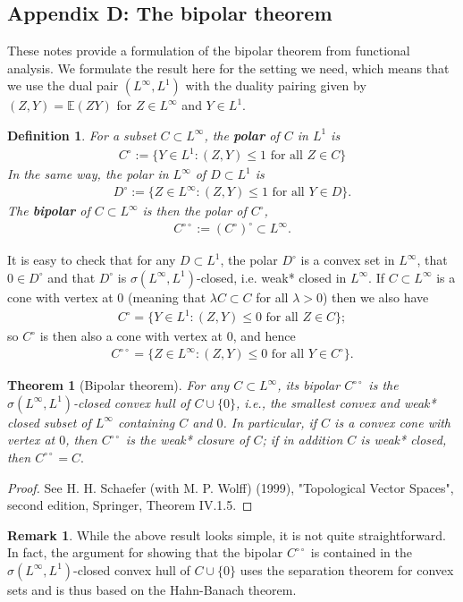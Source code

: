 \documentclass[12pt,a4paper, twoside]{article}
\newtheorem{thm}{Theorem}[section]
\newtheorem{defn}{Definition}[section]
\theoremstyle{definition}
\newtheorem{rem}{Remark}[section]
\newcommand{\EE}{\mathbb{E}} %
\begin{document}
\subsection{Appendix D: The bipolar theorem}
These notes provide a formulation of the bipolar theorem from functional analysis. We formulate the result here for the setting we need, which means that we use the dual pair $(L^\infty, L^1)$ with the duality pairing given by $(Z,Y)= \EE(ZY)$ for $Z \in L^\infty$ and $Y \in L^1$.
\begin{defn} For a subset $C \subset L^\infty$, the \textbf{polar} of $C$ in $L^1$ is 
\begin{align*}
C^\circ:= \{ Y \in L^1: (Z,Y) \leq 1 \text{ for all } Z \in C \}
\end{align*}
In the same way, the polar in $L^\infty$ of $D \subset L^1$ is 
\begin{align*}
D^\circ := \{ Z \in L^\infty : (Z,Y) \leq 1 \text{ for all } Y \in D \}.
\end{align*}
The \textbf{bipolar} of $C \subset L^\infty$ is then the polar of $C^\circ$, 
\begin{align*}
C^{\circ \circ} := (C^\circ)^\circ \subset L^\infty.
\end{align*}
\end{defn}
It is easy to check that for any $D \subset L^1$, the polar $D^\circ$ is a convex set in $L^\infty$, that $0 \in D^\circ$ and that $D^\circ$ is $\sigma(L^\infty, L^1)$-closed, i.e. weak* closed in $L^\infty$. If $C \subset L^\infty$ is a cone with vertex at $0$ (meaning that $\lambda C \subset C$ for all $\lambda >0$) then we also have 
\begin{align*}
C^\circ = \{ Y \in L^1 : (Z,Y) \leq 0 \text{ for all } Z \in C\};
\end{align*}
so $C^\circ$ is then also a cone with vertex at $0$,  and hence 
\begin{align*}
C^{\circ \circ } = \{ Z \in L^\infty : (Z,Y) \leq 0 \text{ for all } Y \in C^\circ \}. 
\end{align*}
\begin{thm}[Bipolar theorem] For any $C \subset L^\infty$, its bipolar $C^{\circ \circ}$ is the $\sigma (L^\infty, L^1)$-closed convex hull of $C \cup \{0\}$, i.e., the smallest convex and weak* closed subset of $L^\infty$ containing $C$ and $0$. In particular, if $C$ is a convex cone with vertex at $0$, then $C^{\circ \circ}$ is the weak* closure of $C$; if in addition $C$ is weak* closed, then $C^{ \circ \circ}=C.$
\end{thm}
\begin{proof}
See H. H. Schaefer (with M. P. Wolff) (1999), "Topological Vector Spaces", second edition, Springer, Theorem IV.1.5.
\end{proof}
\begin{rem} While the above result looks simple, it is not quite straightforward. In fact, the argument for showing that the bipolar $C^{\circ \circ}$ is contained in the $\sigma(L^\infty, L^1)$-closed convex hull of $C \cup \{0\}$ uses the separation theorem for convex sets and is thus based on the Hahn-Banach theorem.
\end{rem}
\newpage
\end{document}
